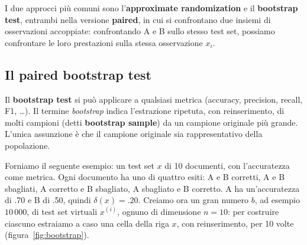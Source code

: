 I due approcci più comuni sono l'\textbf{approximate randomization} e il \textbf{bootstrap test}, entrambi nella versione \textbf{paired}, in cui si confrontano due insiemi di osservazioni accoppiate: confrontando A e B sullo stesso test set, possiamo confrontare le loro prestazioni sulla stessa osservazione $x_i$.

\subsection{Il paired bootstrap test}
Il \textbf{bootstrap test} \cite{efron1993} si può applicare a qualsiasi metrica (accuracy, precision, recall, F1, \dots). Il termine \textit{bootstrap} indica l'estrazione ripetuta, con reinserimento, di molti campioni (detti \textbf{bootstrap sample}) da un campione originale più grande. L'unica assunzione è che il campione originale sia rappresentativo della popolazione.

Forniamo il seguente esempio: un test set $x$ di 10 documenti, con l'accuratezza come metrica. Ogni documento ha uno di quattro esiti: A e B corretti, A e B sbagliati, A corretto e B sbagliato, A sbagliato e B corretto. A ha un'accuratezza di .70 e B di .50, quindi $\delta(x) = .20$. Creiamo ora un gran numero $b$, ad esempio $10\,000$, di test set virtuali $x^{(i)}$, ognuno di dimensione $n = 10$: per costruire ciascuno estraiamo a caso una cella della riga $x$, con reinserimento, per 10 volte (figura~\ref{fig:bootstrap}).


